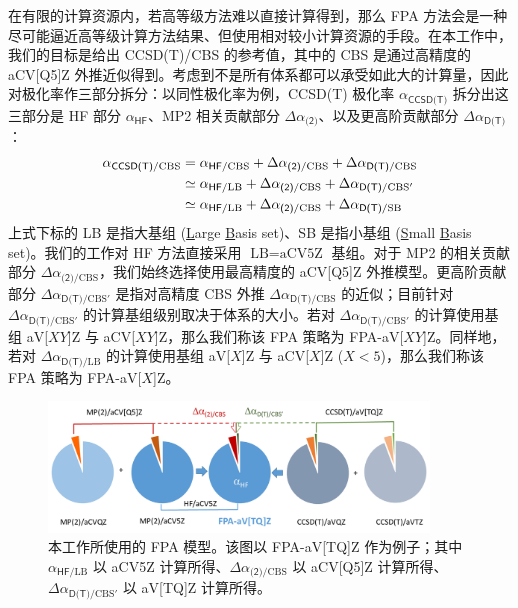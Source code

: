 在有限的计算资源内，若高等级方法难以直接计算得到，那么 FPA 方法会是一种尽可能逼近高等级计算方法结果、但使用相对较小计算资源的手段。在本工作中，我们的目标是给出 CCSD(T)/CBS 的参考值，其中的 CBS 是通过高精度的 aCV[Q5]Z 外推近似得到。考虑到不是所有体系都可以承受如此大的计算量，因此对极化率作三部分拆分：以同性极化率为例，CCSD(T) 极化率 $\alpha_\textsf{CCSD(T)}$ 拆分出这三部分是 HF 部分 $\alpha_\textsf{HF}$、MP2 相关贡献部分 $\Delta \alpha_\textsf{(2)}$、以及更高阶贡献部分 $\Delta \alpha_\textsf{D(T)}$：
\begin{align}
    \alpha_{\textsf{CCSD(T)}/\text{CBS}} &= \alpha_{\textsf{HF}/\text{CBS}} + \Delta \alpha_{\textsf{(2)}/\text{CBS}} + \Delta \alpha_{\textsf{D(T)}/\text{CBS}} \notag\\
    &\simeq \alpha_{\textsf{HF}/\text{LB}} + \Delta \alpha_{\textsf{(2)}/\text{CBS}} + \Delta \alpha_{\textsf{D(T)}/\text{CBS}'} \notag\\
    &\simeq \alpha_{\textsf{HF}/\text{LB}} + \Delta \alpha_{\textsf{(2)}/\text{CBS}} + \Delta \alpha_{\textsf{D(T)}/\text{SB}}
\end{align}
上式下标的 LB 是指大基组 (\underline{L}arge \underline{B}asis set)、SB 是指小基组 (\underline{S}mall \underline{B}asis set)。我们的工作对 HF 方法直接采用 $\text{LB} = \text{aCV5Z}$ 基组。对于 MP2 的相关贡献部分 $\Delta \alpha_{\textsf{(2)}/\text{CBS}}$，我们始终选择使用最高精度的 aCV[Q5]Z 外推模型。更高阶贡献部分 $\Delta \alpha_{\textsf{D(T)}/\text{CBS}'}$ 是指对高精度 CBS 外推 $\Delta \alpha_{\textsf{D(T)}/\text{CBS}}$ 的近似；目前针对 $\Delta \alpha_{\textsf{D(T)}/\text{CBS}'}$ 的计算基组级别取决于体系的大小。若对 $\Delta \alpha_{\textsf{D(T)}/\text{CBS}'}$ 的计算使用基组 aV[$XY$]Z 与 aCV[$XY$]Z，那么我们称该 FPA 策略为 FPA-aV[$XY$]Z。同样地，若对 $\Delta \alpha_{\textsf{D(T)}/\text{LB}}$ 的计算使用基组 aV[$X$]Z 与 aCV[$X$]Z ($X < 5$)，那么我们称该 FPA 策略为 FPA-aV[$X$]Z。

\begin{figure}[ht]
    \centering
    \caption{本工作所使用的 FPA 模型。该图以 FPA-aV[TQ]Z 作为例子；其中 $\alpha_{\textsf{HF}/\text{LB}}$ 以 aCV5Z 计算所得、$\Delta \alpha_{\textsf{(2)}/\text{CBS}}$ 以 aCV[Q5]Z 计算所得、$\Delta \alpha_{\textsf{D(T)}/\text{CBS}'}$ 以 aV[TQ]Z 计算所得。}
    \label{fig.fig-1}
    \includegraphics[width=0.9\textwidth]{assets/fig-1.png}
\end{figure}

